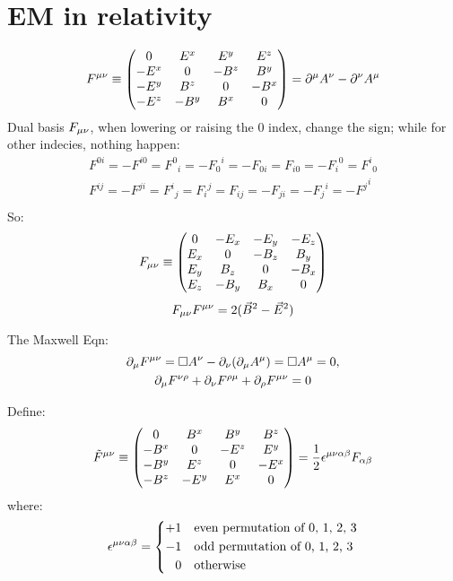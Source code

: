 \section{EM in relativity}

\begin{equation}
    F^{\mu\nu} \equiv 
	\begin{pmatrix}
	    0	& E^x	& E^y	& E^z	\\
	    -E^x    & 0	& -B^z	& B^y	\\
	    -E^y    & B^z   & 0	& -B^x	\\
	    -E^z    & -B^y  & B^x   & 0	\\
	\end{pmatrix}
	= \partial^\mu A^\nu - \partial^\nu A^\mu
\end{equation}
Dual basis $F_{\mu\nu}$, when lowering or raising the 0 index, change the sign; while
for other indecies, nothing happen:
\[
    \begin{aligned}
    F^{0i} = -F^{i0} = {F^0}_i = -{F_0}^i = -F_{0i} =  F_{i0} = -{F_i}^0 = {F^i}_0   \\
    F^{ij} = -F^{ji} = {F^i}_j =  {F_i}^j =  F_{ij} = -F_{ji} = -{F_j}^i = -{F^j}^i \\
    \end{aligned}
\]
So:
\begin{equation}
    F_{\mu\nu} \equiv 
	\begin{pmatrix}
	    0	& -E_x	& -E_y	& -E_z	\\
	    E_x    & 0	& -B_z	& B_y	\\
	    E_y    & B_z   & 0	& -B_x	\\
	    E_z    & -B_y  & B_x   & 0	\\
	\end{pmatrix}
\end{equation}
\[
    F_{\mu\nu}F^{\mu\nu} = 2(\vec{B}^2 - \vec{E}^2)
\]

The Maxwell Eqn:
\begin{gather}
    \partial_\mu F^{\mu\nu} = \Box A^\nu - \partial_\nu(\partial_\mu A^\mu) =
    \Box A^\mu = 0, \notag\\
    \partial_\mu F^{\nu\rho} + \partial_\nu F^{\rho\mu} + \partial_\rho F^{\mu\nu} = 0
\end{gather}

Define:
\begin{equation}
    \tilde{F}^{\mu\nu} \equiv 
	\begin{pmatrix}
	    0	& B^x	& B^y	& B^z	\\
	    -B^x    & 0	& -E^z	& E^y	\\
	    -B^y    & E^z   & 0	& -E^x	\\
	    -B^z    & -E^y  & E^x   & 0	\\
	\end{pmatrix} 
	= \frac{1}{2}\epsilon^{\mu\nu\alpha\beta}F_{\alpha\beta}
\end{equation}
where:
\[
    \epsilon^{\mu\nu\alpha\beta} = 
    \left\{ 
	\begin{aligned}
	    +1	&\quad	\text{even permutation of 0, 1, 2, 3}	\\
	    -1	&\quad	\text{odd permutation of 0, 1, 2, 3}	\\
	    0	&\quad	\text{otherwise}
	\end{aligned}
	\right.
\]

